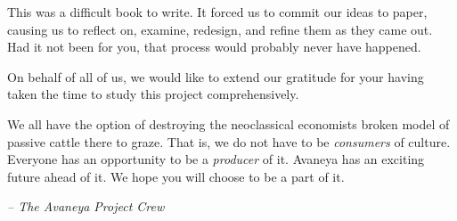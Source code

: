 

This was a difficult book to write. It forced us to commit our ideas to paper, causing us to reflect on, examine, redesign, and refine them as they came out. Had it not been for you, that process would probably never have happened. 

On behalf of all of us, we would like to extend our gratitude for your having taken the time to study this project comprehensively. 

We all have the option of destroying the neoclassical economists broken model of passive cattle there to graze. That is, we do not have to be {\it consumers} of culture. Everyone has an opportunity to be a {\it producer} of it. Avaneya has an exciting future ahead of it. We hope you will choose to be a part of it. 

\hskip 1.5cm {\it -- The Avaneya Project Crew}

\StopChapter

